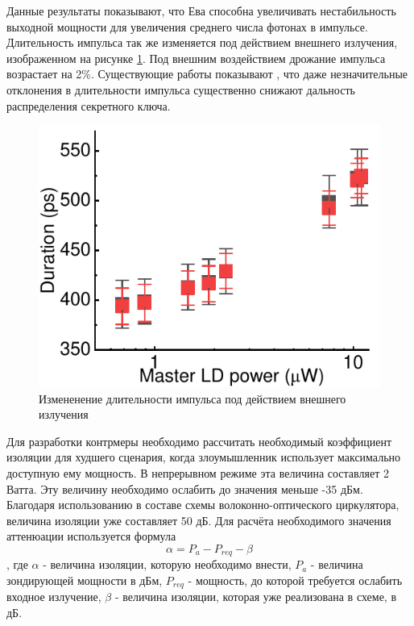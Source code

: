 Данные результаты показывают, что Ева способна увеличивать нестабильность выходной мощности для увеличения среднего числа фотонах в импульсе. Длительность импульса так же изменяется под действием внешнего излучения, изображенном на рисунке \ref{fig:duration ref}. Под внешним воздействием дрожание импульса возрастает на 2\%.  Существующие работы показывают \cite{xie2019}, что даже незначительные отклонения в длительности импульса существенно снижают дальность распределения секретного ключа. 
\begin{figure}
    \centering
    \includegraphics{images/duration_change.pdf}
    \caption{Измененение длительности импульса под действием внешнего излучения}
    \label{fig:duration ref}
\end{figure}
\newline Для разработки контрмеры необходимо рассчитать необходимый коэффициент изоляции для худшего сценария, когда злоумышленник использует максимально доступную ему мощность. В непрерывном режиме эта величина составляет 2 Ватта. Эту величину необходимо ослабить до значения меньше -35 дБм. Благодаря использованию в составе схемы волоконно-оптического циркулятора, величина изоляции уже составляет 50 дБ.  Для расчёта необходимого значения аттенюации используется формула
\begin{equation}
\label{eq:isolation}
    \alpha = P_a - P_{req} - \beta
\end{equation}, где $\alpha$ - величина изоляции, которую необходимо внести, $P_a$ - величина зондирующей мощности в дБм, $P_{req}$ - мощность, до которой требуется ослабить входное излучение, $\beta$ - величина изоляции, которая уже реализована в схеме, в дБ. 
